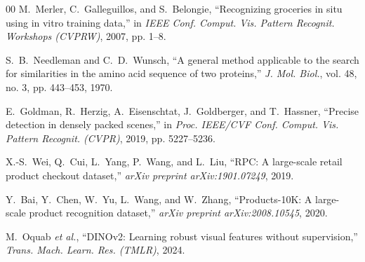\documentclass[conference]{IEEEtran}
\begin{document}
\begin{thebibliography}{00}
M.~Merler, C.~Galleguillos, and S.~Belongie, ``Recognizing groceries in situ using in vitro training data,'' in \textit{IEEE Conf. Comput. Vis. Pattern Recognit. Workshops (CVPRW)}, 2007, pp. 1--8.

S.~B.~Needleman and C.~D.~Wunsch, ``A general method applicable to the search for similarities in the amino acid sequence of two proteins,'' \textit{J. Mol. Biol.}, vol. 48, no. 3, pp. 443--453, 1970.

E.~Goldman, R.~Herzig, A.~Eisenschtat, J.~Goldberger, and T.~Hassner, ``Precise detection in densely packed scenes,'' in \textit{Proc. IEEE/CVF Conf. Comput. Vis. Pattern Recognit. (CVPR)}, 2019, pp. 5227--5236.

X.-S.~Wei, Q.~Cui, L.~Yang, P.~Wang, and L.~Liu, ``RPC: A large-scale retail product checkout dataset,'' \textit{arXiv preprint arXiv:1901.07249}, 2019.

Y.~Bai, Y.~Chen, W.~Yu, L.~Wang, and W.~Zhang, ``Products-10K: A large-scale product recognition dataset,'' \textit{arXiv preprint arXiv:2008.10545}, 2020.

M.~Oquab \textit{et al.}, ``DINOv2: Learning robust visual features without supervision,'' \textit{Trans. Mach. Learn. Res. (TMLR)}, 2024.
\end{thebibliography}
\end{document}
